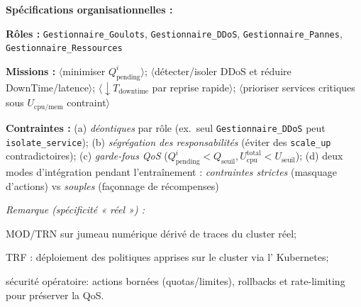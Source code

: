 \noindent\textbf{Spécifications organisationnelles :}
\begin{enumerate*}[label={\roman*)}, itemjoin={;\quad}]
  \item \textbf{Rôles :} \texttt{Gestionnaire\_Goulots}, \texttt{Gestionnaire\_DDoS}, \texttt{Gestionnaire\_Pannes}, \texttt{Gestionnaire\_Ressources}
  \item \textbf{Missions :}
  \(\langle\)minimiser \(Q_{\text{pending}}^i\)\(\rangle\);
  \(\langle\)détecter/isoler DDoS et réduire DownTime/latence\(\rangle\);
  \(\langle\)\(\downarrow T_{\text{downtime}}\) par reprise rapide\(\rangle\);
  \(\langle\)prioriser services critiques sous \(U_{\text{cpu/mem}}\) contraint\(\rangle\)
  \item \textbf{Contraintes :}
  (a) \emph{déontiques} par rôle (ex.~seul \texttt{Gestionnaire\_DDoS} peut \texttt{isolate\_service});
  (b) \emph{ségrégation des responsabilités} (éviter des \texttt{scale\_up} contradictoires);
  (c) \emph{garde-fous QoS} (\(Q_{\text{pending}}^i<Q_{\text{seuil}}, U_{\text{cpu}}^{\text{total}}<U_{\text{seuil}}\));
  (d) deux modes d'intégration pendant l'entraînement : \textit{contraintes strictes} (masquage d'actions) vs \textit{souples} (façonnage de récompenses)
\end{enumerate*}

\medskip
\noindent\textit{Remarque (spécificité « réel ») :}
\begin{enumerate*}[label={--}, itemjoin={\quad}]
  \item \textsc{MOD/TRN} sur jumeau numérique dérivé de traces du cluster réel;
  \item \textsc{TRF} : déploiement des politiques apprises sur le cluster via l' Kubernetes;
  \item sécurité opératoire: actions bornées (quotas/limites), rollbacks et rate-limiting pour préserver la QoS.
\end{enumerate*}


